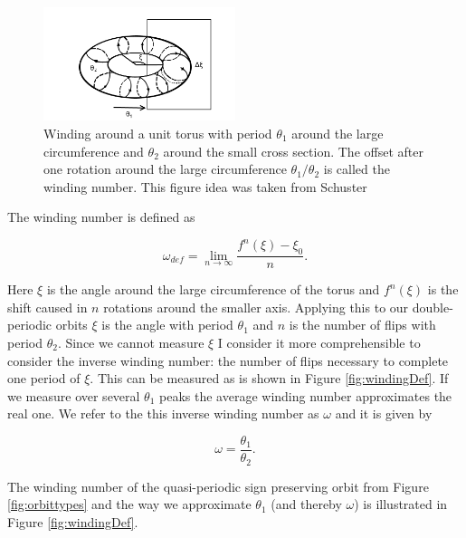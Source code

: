 \begin{figure}[H]
\begin{center}
\includegraphics[width=0.5\textwidth]{figures/theory/torus.png}
\end{center}
\caption{Winding around a unit torus with period $\theta_1$ around the large circumference and $\theta_2$ around the small cross section. The offset after one rotation around the large circumference $\theta_1 / \theta_2$ is called the winding number. This figure idea was taken from Schuster \cite{introchaos}}
\label{fig:torus}
\end{figure}

\noindent The winding number is defined as \cite{introchaos}

\begin{equation}
\omega_{def}  = \lim\limits_{n \rightarrow \infty} \frac{f^n(\xi) - \xi_0}{n}.
\end{equation}

\noindent Here $\xi$ is the angle around the large circumference of the torus and $f^n(\xi)$ is the shift caused in $n$ rotations around the smaller axis. 
Applying this to our double-periodic orbits $\xi$ is the angle with period $\theta_1$ and $n$ is the number of flips with period $\theta_2$. 
Since we cannot measure $\xi$ I consider it more comprehensible to consider the inverse winding number: the number of flips necessary to 
complete one period of $\xi$. This can be measured as is shown in Figure \ref{fig:windingDef}. If we measure over several $\theta_1$ peaks the average winding number approximates the real one. We refer to the this inverse winding number as $\omega$ and it is given by

\begin{equation}\label{eq:winding}
\omega = \frac{\theta_1}{\theta_2}.
\end{equation}

\noindent The winding number of the quasi-periodic sign preserving orbit from Figure \ref{fig:orbittypes} and the way we approximate $\theta_1$ (and thereby $\omega$) is illustrated in Figure \ref{fig:windingDef}.

